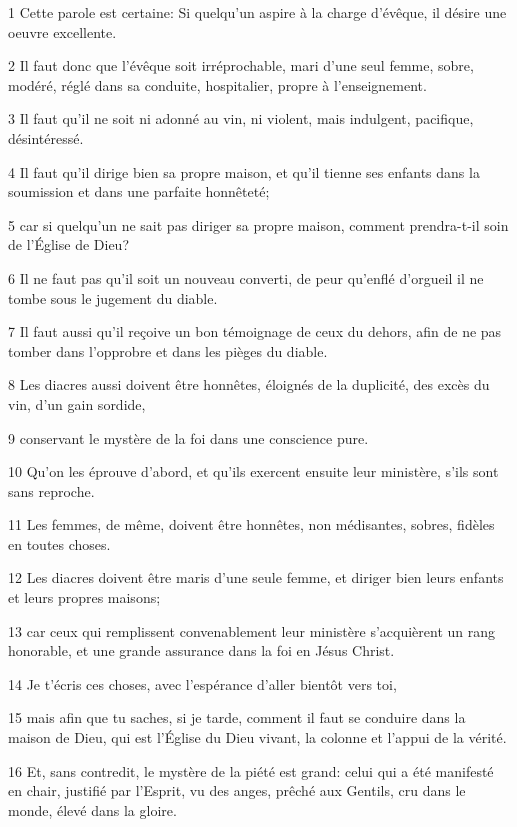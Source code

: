 \par 1 Cette parole est certaine: Si quelqu'un aspire à la charge d'évêque, il désire une oeuvre excellente.
\par 2 Il faut donc que l'évêque soit irréprochable, mari d'une seul femme, sobre, modéré, réglé dans sa conduite, hospitalier, propre à l'enseignement.
\par 3 Il faut qu'il ne soit ni adonné au vin, ni violent, mais indulgent, pacifique, désintéressé.
\par 4 Il faut qu'il dirige bien sa propre maison, et qu'il tienne ses enfants dans la soumission et dans une parfaite honnêteté;
\par 5 car si quelqu'un ne sait pas diriger sa propre maison, comment prendra-t-il soin de l'Église de Dieu?
\par 6 Il ne faut pas qu'il soit un nouveau converti, de peur qu'enflé d'orgueil il ne tombe sous le jugement du diable.
\par 7 Il faut aussi qu'il reçoive un bon témoignage de ceux du dehors, afin de ne pas tomber dans l'opprobre et dans les pièges du diable.
\par 8 Les diacres aussi doivent être honnêtes, éloignés de la duplicité, des excès du vin, d'un gain sordide,
\par 9 conservant le mystère de la foi dans une conscience pure.
\par 10 Qu'on les éprouve d'abord, et qu'ils exercent ensuite leur ministère, s'ils sont sans reproche.
\par 11 Les femmes, de même, doivent être honnêtes, non médisantes, sobres, fidèles en toutes choses.
\par 12 Les diacres doivent être maris d'une seule femme, et diriger bien leurs enfants et leurs propres maisons;
\par 13 car ceux qui remplissent convenablement leur ministère s'acquièrent un rang honorable, et une grande assurance dans la foi en Jésus Christ.
\par 14 Je t'écris ces choses, avec l'espérance d'aller bientôt vers toi,
\par 15 mais afin que tu saches, si je tarde, comment il faut se conduire dans la maison de Dieu, qui est l'Église du Dieu vivant, la colonne et l'appui de la vérité.
\par 16 Et, sans contredit, le mystère de la piété est grand: celui qui a été manifesté en chair, justifié par l'Esprit, vu des anges, prêché aux Gentils, cru dans le monde, élevé dans la gloire.

